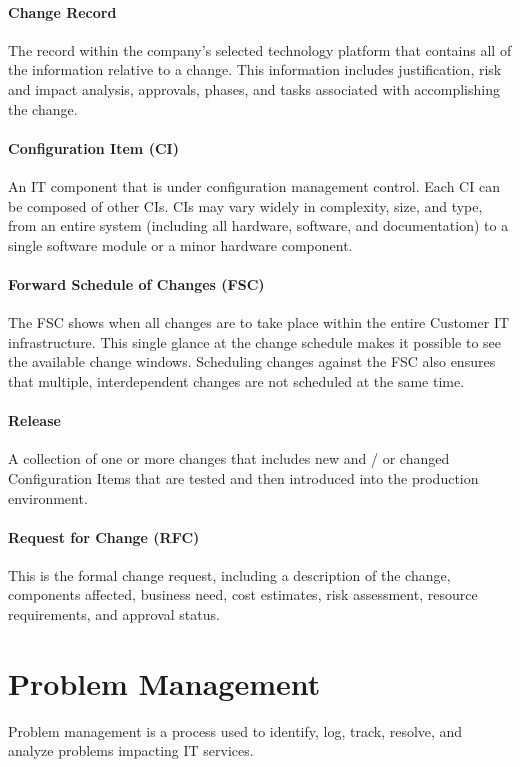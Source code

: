 \documentclass[a4]{article}
\begin{document}
\begin{multicols}{3}
    \paragraph{Change Record} The record within the company’s selected technology platform that contains all of the
    information relative to a change. This information includes justification, risk and impact analysis,
    approvals, phases, and tasks associated with accomplishing the change.
    \paragraph{Configuration Item (CI)} An IT component that is under configuration management control. Each CI can
    be composed of other CIs. CIs may vary widely in complexity, size, and type, from an entire system
    (including all hardware, software, and documentation) to a single software module or a minor hardware
    component.
    \paragraph{Forward Schedule of Changes (FSC)} The FSC shows when all changes are to take place within the
    entire Customer IT infrastructure. This single glance at the change schedule makes it possible to see the
    available change windows. Scheduling changes against the FSC also ensures that multiple,
    interdependent changes are not scheduled at the same time.
    \paragraph{Release} A collection of one or more changes that includes new and / or changed Configuration Items
    that are tested and then introduced into the production environment.
    \paragraph{Request for Change (RFC)} This is the formal change request, including a description of the change,
    components affected, business need, cost estimates, risk assessment, resource requirements, and
    approval status.


\section{Problem Management}
Problem management is a process used to identify, log, track, resolve, and analyze problems impacting IT services.


\end{multicols}
\end{document}
